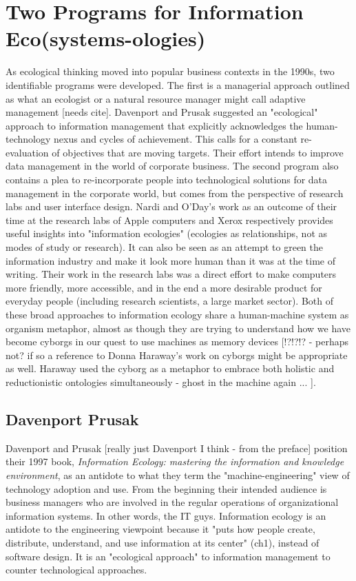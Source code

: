 \section{Two Programs for Information Eco(systems-ologies)}

As ecological thinking moved into popular business contexts in the 1990s, two identifiable programs were developed. The first is a managerial approach outlined as what an ecologist or a natural resource manager might call adaptive management [needs cite]. Davenport and Prusak suggested an "ecological" approach to information management that explicitly acknowledges the human-technology nexus and cycles of achievement. This calls for a constant re-evaluation of objectives that are moving targets. Their effort intends to improve data management in the world of corporate business. The second program also contains a plea to re-incorporate people into technological solutions for data management in the corporate world, but comes from the perspective of research labs and user interface design. Nardi and O'Day's work as an outcome of their time at the research labs of Apple computers and Xerox respectively provides useful insights into "information ecologies" (ecologies as relationships, not as modes of study or research). It can also be seen as an attempt to green the information industry and make it look more human than it was at the time of writing. Their work in the research labs was a direct effort to make computers more friendly, more accessible, and in the end a more desirable product for everyday people (including research scientists, a large market sector). Both of these broad approaches to information ecology share a human-machine system as organism metaphor, almost as though they are trying to understand how we have become cyborgs in our quest to use machines as memory devices \citep[cf.][]{bowker_2005} [!?!?!? - perhaps not? if so a reference to Donna Haraway's work on cyborgs might be appropriate as well. Haraway used the cyborg as a metaphor to embrace both holistic and reductionistic ontologies simultaneously - ghost in the machine again ... \citep{haraway_1991}].

\subsection{Davenport Prusak}

Davenport and Prusak [really just Davenport I think - from the preface] position their 1997 book, \textit{Information Ecology: mastering the information and knowledge environment}, as an antidote to what they term the "machine-engineering" view of technology adoption and use. From the beginning their intended audience is business managers who are involved in the regular operations of organizational information systems. In other words, the IT guys. Information ecology is an antidote to the engineering viewpoint because it "puts how people create, distribute, understand, and use information at its center" (ch1), instead of software design. It is an "ecological approach" to information management to counter technological approaches.

